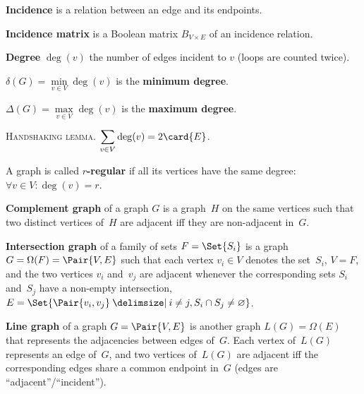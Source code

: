 \documentclass[a4paper,10pt]{article}
\newcommand{\op}[1]{\operatorname*{#1}}
\newcommand{\degree}[1]{\op{deg}(#1)}
\newcommand{\minDegree}[1]{\delta(#1)}
\newcommand{\maxDegree}[1]{\Delta(#1)}
\begin{document}
\begin{terms}
\begin{minipage}{\linewidth}
    \item \textbf{Incidence} is a relation between an edge and its endpoints.
    \item \textbf{Incidence matrix} is a Boolean matrix $B_{V \times E}$ of an incidence relation.

    \end{minipage}

    \item \textbf{Degree} $\degree{v}$ the number of edges incident to $v$ (loops are counted twice).

    \begin{terms}
        \item $\minDegree{G} = \min\limits_{v \in V} \degree{v}$ is the \textbf{minimum degree}.
        \item $\maxDegree{G} = \max\limits_{v \in V} \degree{v}$ is the \textbf{maximum degree}.
        \item \textsc{Handshaking lemma}. $\displaystyle \sum_{v \in V} \degree{v} = 2 \card{E}$.
    \end{terms}

    \item A graph is called \textbf{$r$-regular} if all its vertices have the same degree: $\forall v \in V : \degree{v} = r$.

    \item \textbf{Complement graph} of a graph $G$ is a graph~$H$ on the same vertices such that two distinct vertices of~$H$ are adjacent iff they are non-adjacent in~$G$.

    \item \textbf{Intersection graph} of a family of sets $F = \Set{S_i}$ is a graph $G = \Omega(F) = \Pair{V,E}$ such that each vertex $v_i \in V$ denotes the set~$S_i$, \ie $V = F$, and the two vertices $v_i$ and~$v_j$ are adjacent whenever the corresponding sets $S_i$ and~$S_j$ have a non-empty intersection, \ie $E = \Set{ \Pair{v_i,v_j} \given i \neq j, S_i \intersection S_j \neq \emptyset }$.


    \item \textbf{Line graph} of a graph $G = \Pair{V,E}$ is another graph $L(G) = \Omega(E)$ that represents the adjacencies between edges of~$G$. Each vertex of~$L(G)$ represents an edge of~$G$, and two vertices of~$L(G)$ are adjacent iff the corresponding edges share a common endpoint in~$G$ (\ie edges are \enquote{adjacent}/\enquote{incident}).


\end{terms}
\end{document}
